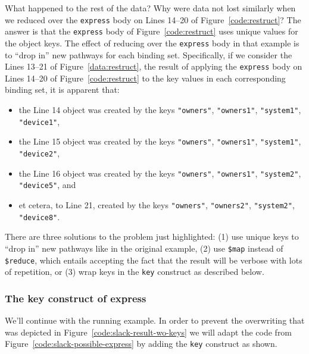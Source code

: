 \documentclass[9pt,letterpaper]{article}
\newcommand{\stt}[1]{\texttt{#1}} %
\begin{document}
What happened to the rest of the data?
Why were data not lost similarly when we reduced over the \stt{express} body on Lines 14--20 of Figure~\ref{code:restruct}?
The answer is that the \stt{express} body of Figure~\ref{code:restruct} uses unique values for the object keys.
The effect of reducing over the \stt{express} body in that example is to ``drop in'' new pathways for each binding set.
Specifically, if we consider the Lines 13--21 of Figure~\ref{data:restruct}, the result of applying the \stt{express} body on Lines 14--20 of Figure~\ref{code:restruct} to the key values in  each corresponding binding set, it is apparent that:

\begin{itemize}
\item the Line 14 object was created by the keys \stt{"owners"}, \stt{"owners1"}, \stt{"system1"}, \stt{"device1"},
\item the Line 15 object was created by the keys \stt{"owners"}, \stt{"owners1"}, \stt{"system1"}, \stt{"device2"},
\item the Line 16 object was created by the keys \stt{"owners"}, \stt{"owners1"}, \stt{"system2"}, \stt{"device5"}, and
\item et cetera, to Line 21, created by the keys \stt{"owners"}, \stt{"owners2"}, \stt{"system2"}, \stt{"device8"}.
\end{itemize}

There are three solutions to the problem just highlighted:
(1) use unique keys to ``drop in'' new pathways like in the original example,
(2) use \stt{\$map} instead of \stt{\$reduce}, which entails accepting the fact that the result will be verbose with lots of repetition, or
(3) wrap keys in the \stt{key} construct as described below.

\subsubsection{The key construct of express}

We'll continue with the running example.
In order to prevent the overwriting that was depicted in Figure~\ref{code:slack-result-wo-keys} we will
adapt the code from Figure~\ref{code:slack-possible-express} by adding the \stt{key} construct as shown.
\end{document}
